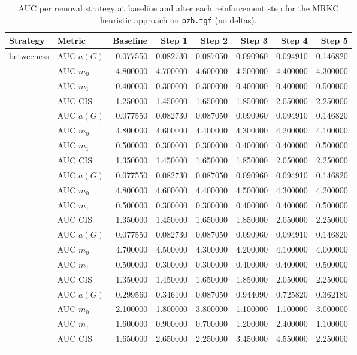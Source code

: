 \begin{table}[htbp]
  \centering
  \caption{AUC per removal strategy at baseline and after each reinforcement step for the MRKC heuristic approach on \texttt{pzb.tgf} (no deltas).}
  \label{tab:pzb-mrkc_heuristic-auc}
  \begin{tabular}{llrrrrrr}
    \toprule
    \textbf{Strategy} & \textbf{Metric} & \textbf{Baseline} & \textbf{Step 1} & \textbf{Step 2} & \textbf{Step 3} & \textbf{Step 4} & \textbf{Step 5} \\
    \midrule
    \multirow{4}{*}{betweeness} & AUC $a(G)$ & 0.077550 & 0.082730 & 0.087050 & 0.090960 & 0.094910 & 0.146820 \\
    & AUC $m_0$ & 4.800000 & 4.700000 & 4.600000 & 4.500000 & 4.400000 & 4.300000 \\
    & AUC $m_1$ & 0.400000 & 0.300000 & 0.300000 & 0.400000 & 0.400000 & 0.500000 \\
    & AUC CIS & 1.250000 & 1.450000 & 1.650000 & 1.850000 & 2.050000 & 2.250000 \\
    \addlinespace
    \multirow{4}{*}{closeness} & AUC $a(G)$ & 0.077550 & 0.082730 & 0.087050 & 0.090960 & 0.094910 & 0.146820 \\
    & AUC $m_0$ & 4.800000 & 4.600000 & 4.400000 & 4.300000 & 4.200000 & 4.100000 \\
    & AUC $m_1$ & 0.500000 & 0.300000 & 0.300000 & 0.400000 & 0.400000 & 0.500000 \\
    & AUC CIS & 1.350000 & 1.450000 & 1.650000 & 1.850000 & 2.050000 & 2.250000 \\
    \addlinespace
    \multirow{4}{*}{core influence} & AUC $a(G)$ & 0.077550 & 0.082730 & 0.087050 & 0.090960 & 0.094910 & 0.146820 \\
    & AUC $m_0$ & 4.800000 & 4.600000 & 4.400000 & 4.500000 & 4.300000 & 4.200000 \\
    & AUC $m_1$ & 0.500000 & 0.300000 & 0.300000 & 0.400000 & 0.400000 & 0.500000 \\
    & AUC CIS & 1.350000 & 1.450000 & 1.650000 & 1.850000 & 2.050000 & 2.250000 \\
    \addlinespace
    \multirow{4}{*}{degree} & AUC $a(G)$ & 0.077550 & 0.082730 & 0.087050 & 0.090960 & 0.094910 & 0.146820 \\
    & AUC $m_0$ & 4.700000 & 4.500000 & 4.300000 & 4.200000 & 4.100000 & 4.000000 \\
    & AUC $m_1$ & 0.500000 & 0.300000 & 0.300000 & 0.400000 & 0.400000 & 0.500000 \\
    & AUC CIS & 1.350000 & 1.450000 & 1.650000 & 1.850000 & 2.050000 & 2.250000 \\
    \addlinespace
    \multirow{4}{*}{random} & AUC $a(G)$ & 0.299560 & 0.346100 & 0.087050 & 0.944090 & 0.725820 & 0.362180 \\
    & AUC $m_0$ & 2.100000 & 1.800000 & 3.800000 & 1.100000 & 1.100000 & 3.000000 \\
    & AUC $m_1$ & 1.600000 & 0.900000 & 0.700000 & 1.200000 & 2.400000 & 1.100000 \\
    & AUC CIS & 1.650000 & 2.650000 & 2.250000 & 3.450000 & 4.550000 & 2.250000 \\
    \addlinespace
    \bottomrule
  \end{tabular}
\end{table}
